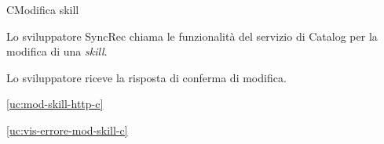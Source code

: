 \begin{usecase}{6}{C}{Modifica skill}



	\begin{ucscenarioprincipale}
		\item Lo sviluppatore SyncRec chiama le funzionalità del servizio di Catalog per la modifica di una \textit{skill}.
		\item Lo sviluppatore riceve la risposta di conferma di modifica.
	\end{ucscenarioprincipale}


	\begin{ucgeneralizzazioni}
		\item \ref{uc:mod-skill-http-c}
	\end{ucgeneralizzazioni}

	\begin{ucestensioni}
		\item \ref{uc:vis-errore-mod-skill-c}
	\end{ucestensioni}

	\label{uc:mod-skill-c}
\end{usecase}

